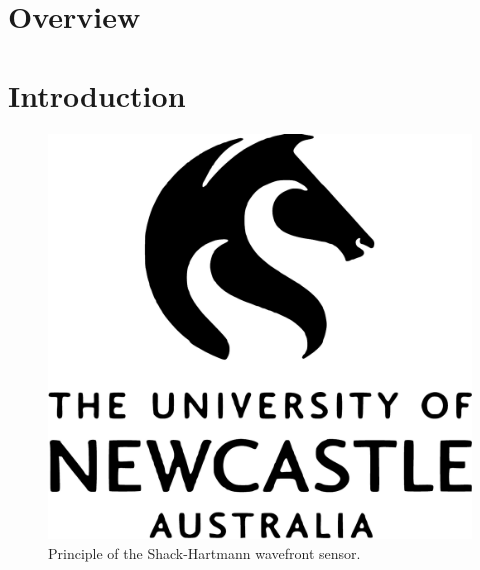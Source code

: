 \documentclass[a4paper,11pt,phdthesis,twoside,oneandhalfspace,pdflatex]{cssethesis} %
\begin{document}


\frontmatter					%

\thesistitlepage				%

\thesiscopyrightpage			%

\thesisdeclarationpage			%



\tableofcontents				%










\mainmatter	%



\chapter{Overview}
\lipsum[1-5]

\cite{astrom2011computer,annaswamy2001adaptive,doyle1979robustnesswithobservers}

\cite{hanus1992conditioning,jang2005saturation}


\cite{mita1977zeros}






\chapter{Introduction}
\lipsum[6-14]


\begin{figure}[ht!]
\centering\includegraphics[width=0.5\linewidth]{newcastleLogo}
\caption{Principle of the Shack-Hartmann wavefront sensor.}
\label{fig:ShackHartmannWFS}
\end{figure}
\end{document}
